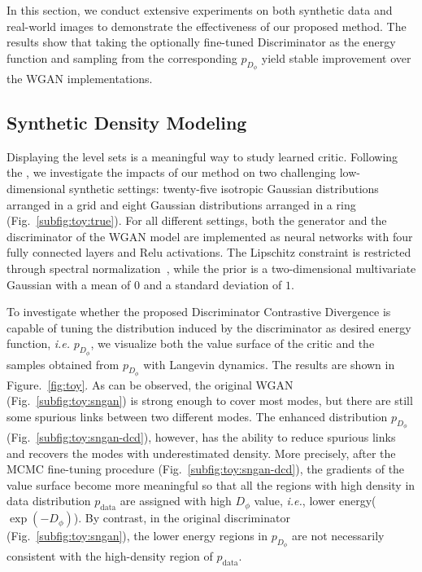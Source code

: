 \documentclass{article}
\begin{document}
In this section, we conduct extensive experiments on both synthetic data and real-world images to demonstrate the effectiveness of our proposed method. The results show that taking the optionally fine-tuned Discriminator as the energy function and sampling from the corresponding $p_{D_\phi}$ yield stable improvement over the WGAN implementations.  


\subsection{Synthetic Density Modeling}
Displaying the level sets is a meaningful way to study learned critic. Following the \cite{azadi2018discriminator,gulrajani2017improved}, we investigate the impacts of our method on two challenging low-dimensional synthetic settings: twenty-five isotropic Gaussian distributions arranged in a grid and eight Gaussian distributions arranged in a ring (Fig.~\ref{subfig:toy:true}). For all different settings, both the generator and the discriminator of the WGAN model are implemented as neural networks with four fully connected layers and Relu activations. The Lipschitz constraint is restricted through spectral normalization~\cite{miyato2018spectral}, while the prior is a two-dimensional multivariate Gaussian with a mean of $0$ and a standard deviation of $1$.


To investigate whether the proposed Discriminator Contrastive Divergence is capable of tuning the distribution induced by the discriminator as desired energy function, \emph{i.e.} $p_{D_\phi}$, we visualize both the value surface of the critic and the samples obtained from $p_{D_\phi}$ with Langevin dynamics. The results are shown in Figure.~\ref{fig:toy}. As can be observed, the original WGAN (Fig.~\ref{subfig:toy:sngan}) is strong enough to cover most modes, but there are still some spurious links between two different modes. The enhanced distribution $p_{D_\phi}$ (Fig.~\ref{subfig:toy:sngan-dcd}), however, has the ability to reduce spurious links and recovers the modes with underestimated density. More precisely, after the MCMC fine-tuning procedure (Fig.~\ref{subfig:toy:sngan-dcd}), the gradients of the value surface become more meaningful so that all the regions with high density in data distribution $p_{\text{data}}$ are assigned with high $D_\phi$ value, \emph{i.e.}, lower energy($\exp(-D_\phi)$). By contrast, in the original discriminator (Fig.~\ref{subfig:toy:sngan}), the lower energy regions in $p_{D_\phi}$ are not necessarily consistent with the high-density region of $p_{\text{data}}$.
\end{document}
